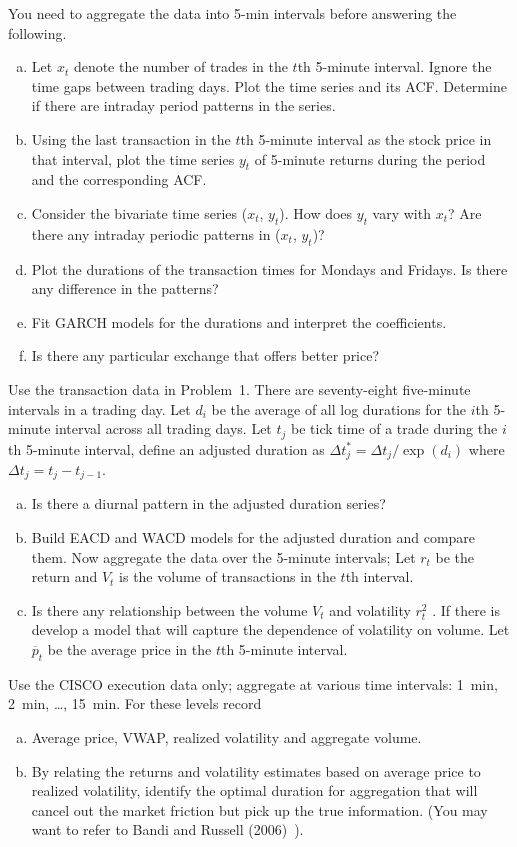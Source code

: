 \prob You need to aggregate the data into 5-min intervals before answering the following.
        \begin{enumerate}[(a)]
        \item Let $x_t$ denote the number of trades in the $t$th 5-minute interval. Ignore the time gaps between trading days. Plot the time series and its ACF. Determine if there are intraday period patterns in the series.
        \item Using the last transaction in the $t$th 5-minute interval as the stock price in that interval, plot the time series $y_t$ of 5-minute returns during the period and the corresponding ACF.
        \item Consider the bivariate time series ($x_t$, $y_t$). How does $y_t$ vary with $x_t$? Are there any intraday periodic patterns in ($x_t$, $y_t$)?
        \item Plot the durations of the transaction times for Mondays and Fridays. Is there any difference in the patterns?
        \item Fit GARCH models for the durations and interpret the coefficients.
        \item Is there any particular exchange that offers better price? \twomedskip
        \end{enumerate}


\prob Use the transaction data in Problem~1. There are seventy-eight five-minute intervals in a trading day. Let $d_i$ be the average of all log durations for the $i$th 5-minute interval across all trading days. Let $t_j$ be tick time of a trade during the $i$th 5-minute interval, define an adjusted duration as $\Delta t_j^* = \Delta t_j/\exp(d_i)$ where $\Delta t_j = t_j - t_{j-1}$.
        \begin{enumerate}[(a)]
        \item Is there a diurnal pattern in the adjusted duration series?
        \item Build EACD and WACD models for the adjusted duration and compare them. Now aggregate the data over the 5-minute intervals; Let $r_t$ be the return and $V_t$ is the volume of transactions in the $t$th interval.
        \item Is there any relationship between the volume $V_t$ and volatility $r_t^2$ . If there is develop a model that will capture the dependence of volatility on volume. Let $\overline{p}_t$ be the average price in the $t$th 5-minute
        interval. \twomedskip
        \end{enumerate}


\prob Use the CISCO execution data only; aggregate at various time intervals: 1~min, 2~min, \dots, 15~min. For these levels record
        \begin{enumerate}[(a)]
        \item Average price, VWAP, realized volatility and aggregate volume.
        \item By relating the returns and volatility estimates based on average price to realized volatility, identify the optimal duration for aggregation that will cancel out the market friction but pick up the true information. (You may want to refer to Bandi and Russell (2006)~\cite{bandi}). \twomedskip
        \end{enumerate}